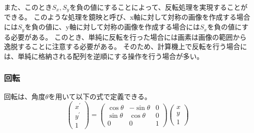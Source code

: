         また、このとき$S_x, S_y$を負の値にすることによって、反転処理を実現することができる。
        このような処理を鏡映と呼び、x軸に対して対称の画像を作成する場合には$S_y$を負の値に、y軸に対して対称の画像を作成する場合には$S_x$を負の値にする必要がある。
        このとき、単純に反転を行った場合には画素は画像の範囲から逸脱することに注意する必要がある。
        そのため、計算機上で反転を行う場合には、単純に格納される配列を逆順にする操作を行う場合が多い。

    \subsubsection{回転}
        回転は、角度$\theta$を用いて以下の式で定義できる。
        \begin{equation}
            \left(\begin{array}{l}
            x^{\prime} \\
            y^{\prime} \\
            1
            \end{array}\right)
            =
            \left(\begin{array}{lll}
            \cos{\theta} & -\sin{\theta} & 0\\
            \sin{\theta} & \cos{\theta} & 0\\
            0 & 0 & 1
            \end{array}\right)
            \left(\begin{array}{l}
            x \\
            y \\
            1
            \end{array}\right)
        \end{equation}
